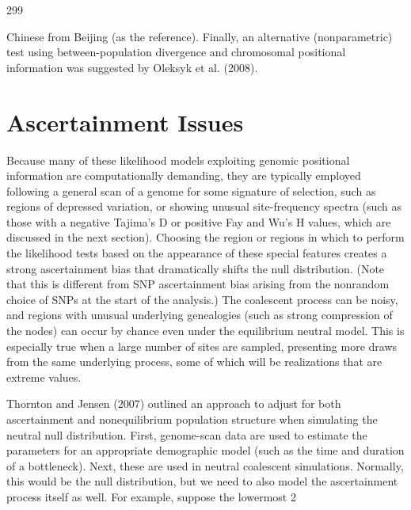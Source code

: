 \documentclass{article}
\begin{document}
299

Chinese from Beijing (as the reference). Finally, an alternative (nonparametric) test using between-population divergence and chromosomal positional information was suggested by Oleksyk et al. (2008).

\section{Ascertainment Issues}
Because many of these likelihood models exploiting genomic positional information are computationally demanding, they are typically employed following a general scan of a genome for some signature of selection, such as regions of depressed variation, or showing unusual site-frequency spectra (such as those with a negative Tajima's D or positive Fay and Wu's H values, which are discussed in the next section). Choosing the region or regions in which to perform the likelihood tests based on the appearance of these special features creates a strong ascertainment bias that dramatically shifts the null distribution. (Note that this is different from SNP ascertainment bias arising from the nonrandom choice of SNPs at the start of the analysis.) The coalescent process can be noisy, and regions with unusual underlying genealogies (such as strong compression of the nodes) can occur by chance even under the equilibrium neutral model. This is especially true when a large number of sites are sampled, presenting more draws from the same underlying process, some of which will be realizations that are extreme values.

Thornton and Jensen (2007) outlined an approach to adjust for both ascertainment and nonequilibrium population structure when simulating the neutral null distribution. First, genome-scan data are used to estimate the parameters for an appropriate demographic model (such as the time and duration of a bottleneck). Next, these are used in neutral coalescent simulations. Normally, this would be the null distribution, but we need to also model the ascertainment process itself as well. For example, suppose the lowermost 2%
\end{document}

